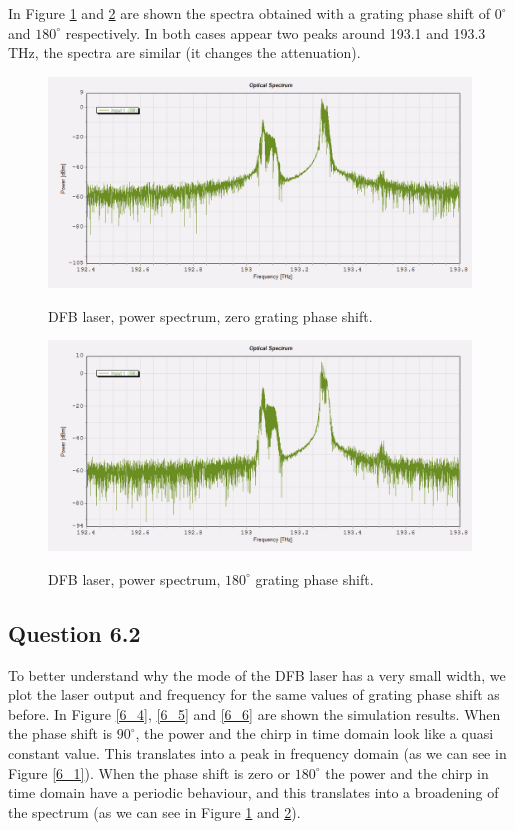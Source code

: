 \documentclass[a4paper,10pt]{report}
\begin{document}
In Figure \ref{6_2} and \ref{6_3} are shown the spectra obtained with a grating phase shift of $0^\circ$ and $180^\circ$ respectively.
In both cases appear two peaks around 193.1 and 193.3 THz, the spectra are similar (it changes the attenuation).

\begin{figure}[!ht]
  \centering
  \includegraphics[width=12cm]{6_2.png}\\
  \caption{DFB laser, power spectrum, zero grating phase shift.}
  \label{6_2}
\end{figure}

\begin{figure}[!ht]
  \centering
  \includegraphics[width=12cm]{6_3.png}\\
  \caption{DFB laser, power spectrum, $180^\circ$ grating phase shift.}
  \label{6_3}
\end{figure}

\subsection*{Question 6.2}
To better understand why the mode of the DFB laser has a very small width, we plot the laser output and frequency for the same values of
grating phase shift as before.
In Figure \ref{6_4}, \ref{6_5} and \ref{6_6} are shown the simulation results.
When the phase shift is $90^\circ$, the power and the chirp in time domain look like a quasi constant value. This translates into a peak
in frequency domain (as we can see in Figure \ref{6_1}).
When the phase shift is zero or $180^\circ$ the power and the chirp in time domain have a periodic behaviour, and this translates into a
broadening of the spectrum (as we can see in Figure \ref{6_2} and \ref{6_3}).
\end{document}
